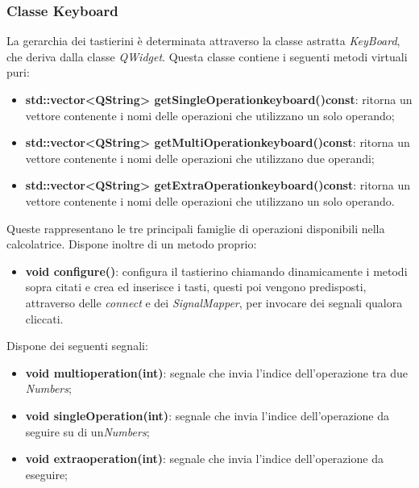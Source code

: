 \documentclass[a4paper,10pt]{article}
\begin{document}
    \subsubsection{Classe Keyboard}
    La gerarchia dei tastierini è determinata attraverso la classe astratta \textit{KeyBoard}, che deriva dalla classe \textit{QWidget}.
    Questa classe contiene i seguenti metodi virtuali puri:
    \begin{itemize}
        \item \textbf{std::vector<QString> getSingleOperationkeyboard()const}: ritorna un vettore contenente i nomi delle operazioni che utilizzano un solo operando;
        \item \textbf{std::vector<QString> getMultiOperationkeyboard()const}: ritorna un vettore contenente i nomi delle operazioni che utilizzano due operandi;
        \item \textbf{std::vector<QString> getExtraOperationkeyboard()const}: ritorna un vettore contenente i nomi delle operazioni che utilizzano un solo operando.
    \end{itemize}
    Queste rappresentano le tre principali famiglie di operazioni disponibili nella calcolatrice.
    Dispone inoltre di un metodo proprio:
        \begin{itemize}
            \item \textbf{void configure()}: configura il tastierino chiamando dinamicamente i metodi sopra citati e crea ed inserisce i tasti, questi poi vengono predisposti, attraverso delle \textit{connect} e dei \textit{SignalMapper}, per invocare dei segnali qualora cliccati.
        \end{itemize}
    Dispone dei seguenti segnali:
        \begin{itemize}
            \item \textbf{void multioperation(int)}: segnale che invia l'indice dell'operazione tra due \textit{Numbers};
            \item \textbf{void singleOperation(int)}: segnale che invia l'indice dell'operazione da seguire su di un\textit{Numbers};
            \item \textbf{void extraoperation(int)}: segnale che invia l'indice dell'operazione da eseguire;
        \end{itemize}
\end{document}

